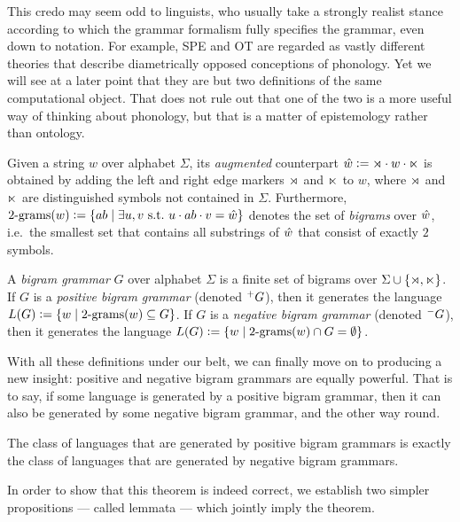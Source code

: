 This credo may seem odd to linguists, who usually take a strongly realist stance according to which the grammar formalism fully specifies the grammar, even down to notation.
For example, SPE and OT are regarded as vastly different theories that describe diametrically opposed conceptions of phonology.
Yet we will see at a later point that they are but two definitions of the same computational object.
That does not rule out that one of the two is a more useful way of thinking about phonology, but that is a matter of epistemology rather than ontology.

\begin{definition}[Bigrams]
    Given a string $w$ over alphabet $\Sigma$, its \emph{augmented} counterpart $\hat{w} \mathrel{\mathop:}= \rtimes \cdot w \cdot \ltimes$ is obtained by adding the left and right edge markers $\rtimes$ and $\ltimes$ to $w$, where $\rtimes$ and $\ltimes$ are distinguished symbols not contained in $\Sigma$.
    Furthermore, 
    \(
    \mathrm{2\text{-}grams}(w) \mathrel{\mathop:}=
        \left \{ 
            ab \mid \exists u,v  \text{ s.t.\ } u \cdot ab \cdot v = \hat{w}
         \right \}
    \)
    denotes the set of \emph{bigrams} over $\hat{w}$, i.e.\ the smallest set that contains all substrings of $\hat{w}$ that consist of exactly $2$ symbols.
\end{definition}

\begin{definition}
    A \emph{bigram grammar} $G$ over alphabet $\Sigma$ is a finite set of bigrams over $\Sigma \cup \left \{ \rtimes, \ltimes \right \}$.
    If $G$ is a \emph{positive bigram grammar} (denoted $^+ G$), then it generates the language
    \(
        L(G) \mathrel{\mathop:}= \left \{ 
            w \mid \mathrm{2\text{-}grams}(w) \subseteq G
         \right \}
    \).
    If $G$ is a \emph{negative bigram grammar} (denoted $^- G$), then it generates the language
    \(
        L(G) \mathrel{\mathop:}= \left \{ 
            w \mid \mathrm{2\text{-}grams}(w) \cap G = \emptyset
         \right \}
    \).
\end{definition}

With all these definitions under our belt, we can finally move on to producing a new insight: positive and negative bigram grammars are equally powerful.
That is to say, if some language is generated by a positive bigram grammar, then it can also be generated by some negative bigram grammar, and the other way round.

\begin{theorem}
    The class of languages that are generated by positive bigram grammars is exactly the class of languages that are generated by negative bigram grammars.
    \label{thm:SL_PosNegEquivalence}
\end{theorem}
%
In order to show that this theorem is indeed correct, we establish two simpler propositions --- called lemmata --- which jointly imply the theorem.

